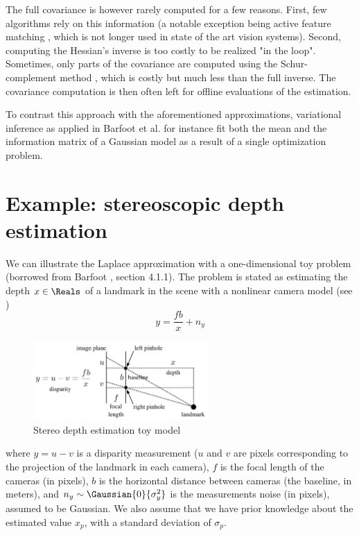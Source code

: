 The full covariance is however rarely computed for a few reasons. First, few algorithms rely on this information (a notable exception being active feature matching \cite{davison2007monoslam}, which is not longer used in state of the art vision systems). Second, computing the Hessian's inverse is too costly to be realized "in the loop". Sometimes, only parts of the covariance are computed using the Schur-complement method \cite{konolige2005slam}, which is costly but much less than the full inverse.
The covariance computation is then often left for offline evaluations of the estimation.

To contrast this approach with the aforementioned approximations, variational inference as applied in Barfoot et al. 
\cite{barfoot2020exactly} for instance fit both the mean and the information matrix of a Gaussian model as a result of a single optimization problem.



\section{Example: stereoscopic depth estimation}

We can illustrate the Laplace approximation with a one-dimensional toy problem (borrowed from Barfoot \cite{barfoot2017state}, section 4.1.1).
The problem is stated as estimating the depth $x \in \Reals$ of a landmark in the scene with a nonlinear camera model (see )
%
\begin{equation}
    y = \frac{fb}{x} + n_y
\end{equation}
%
%
\begin{figure}[h]
    \centering
    \includegraphics[width=0.6\textwidth]{figures/barfoot_stereo.png}
    \caption{Stereo depth estimation toy model \cite{barfoot2017state}}
    \label{fig:barfoot_stereo}
 \end{figure}
%
where $y=u - v$ is a disparity measurement ($u$ and $v$ are pixels corresponding to the projection of the landmark in each camera), $f$ is the focal
length of the cameras (in pixels), $b$ is the horizontal distance between cameras (the baseline, in meters), and $n_y \sim \Gaussian{0}{\sigma_y^2}$ 
is the measurements noise (in pixels), assumed to be Gaussian. We also assume that we have prior knowledge about the 
estimated value $x_p$, with a standard deviation of $\sigma_p$.

